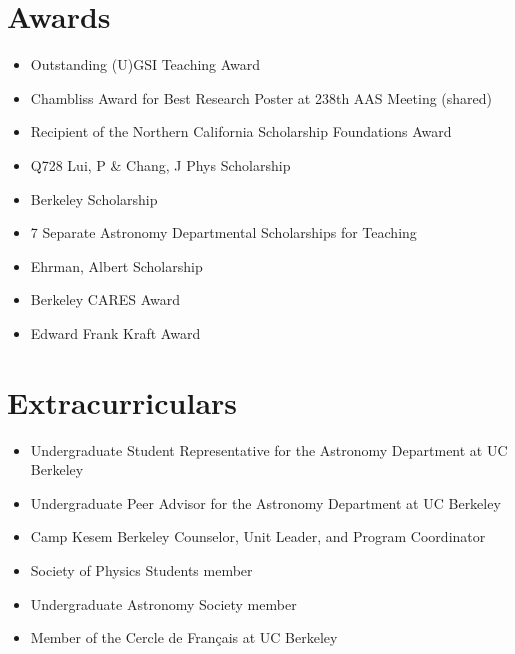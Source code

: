 \documentclass[letterpaper,10pt]{article}
\newcommand{\resumeSubHeadingListStart}{\begin{itemize}[leftmargin=*]}
\newcommand{\resumeSubHeadingListEnd}{\end{itemize}}
\newcommand{\shorterSection}[1]{\vspace{-10pt}\section{#1}}
\begin{document}
 


\shorterSection{Awards}
  \resumeSubHeadingListStart
  \small
    \item{Outstanding (U)GSI Teaching Award}
    \vspace{-3pt}
    \item{Chambliss Award for Best Research Poster at 238th AAS Meeting (shared)}
    \vspace{-3pt}
    \item{Recipient of the Northern California Scholarship Foundations Award}
    \vspace{-3pt}
    \item{Q728 Lui, P \& Chang, J Phys Scholarship}
    \vspace{-3pt}
    \item{Berkeley Scholarship}
    \vspace{-3pt}
    \item{7 Separate Astronomy Departmental Scholarships for Teaching}
    \vspace{-3pt}
    \item{Ehrman, Albert Scholarship}
    \vspace{-3pt}
    \item{Berkeley CARES Award}
    \vspace{-3pt}
    \item{Edward Frank Kraft Award}
  \resumeSubHeadingListEnd

\shorterSection{Extracurriculars}
  \resumeSubHeadingListStart
  \small
    \item{Undergraduate Student Representative for the Astronomy Department at UC Berkeley}
    \vspace{-3pt}
    \item{Undergraduate Peer Advisor for the Astronomy Department at UC Berkeley}
    \vspace{-3pt}
    \item{Camp Kesem Berkeley Counselor, Unit Leader, and Program Coordinator}
    \vspace{-3pt}
    \item{Society of Physics Students member}
    \vspace{-3pt}
    \item{Undergraduate Astronomy Society member}
    \vspace{-3pt}
    \item{Member of the Cercle de Français at UC Berkeley}
  \resumeSubHeadingListEnd
  
\end{document}

